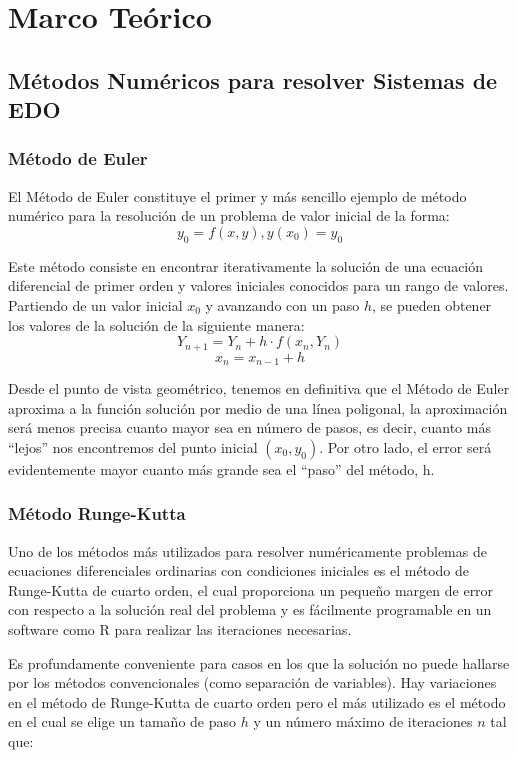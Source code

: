 \documentclass[a4paper,12pt]{article}
\begin{document}
\section{Marco Teórico}

\subsection{Métodos Numéricos para resolver Sistemas de EDO}

\subsubsection{Método de Euler}

El Método de Euler constituye el primer y más sencillo ejemplo de método numérico para la resolución de un problema de valor inicial de la forma:
 \[ y_0 = f(x, y) ,  y(x_0) = y_0 \]

Este método consiste en encontrar iterativamente la solución de una ecuación diferencial de primer orden y valores iniciales conocidos para un rango de valores. Partiendo de un valor inicial $x_0$ y avanzando con un paso $h$, se pueden obtener los valores de la solución de la siguiente manera:
\[ Y_{n+1} = Y_n + h · f(x_n, Y_n) \]
\[ x_n = x_{n-1} + h \]

Desde el punto de vista geométrico, tenemos en definitiva que el Método de Euler
aproxima a la función solución por medio de una línea poligonal, la aproximación será menos precisa cuanto mayor sea en número de pasos, es decir, cuanto más “lejos” nos encontremos del punto inicial $(x_0, y_0)$. Por otro lado, el error será evidentemente mayor cuanto más grande sea el “paso” del método, h.

\subsubsection{Método Runge-Kutta}

Uno de los métodos más utilizados para resolver numéricamente problemas de ecuaciones diferenciales ordinarias con condiciones iniciales es el método de Runge-Kutta de cuarto orden, el cual proporciona un pequeño margen de error con respecto a la solución real del problema y es fácilmente programable en un software como R para realizar las iteraciones necesarias. \par

Es profundamente conveniente para casos en los que la solución no puede hallarse por los métodos convencionales (como separación de variables). Hay variaciones en el
método de Runge-Kutta de cuarto orden pero el más utilizado es el método en el
cual se elige un tamaño de paso $h$ y un número máximo de iteraciones $n$ tal que: \par
\end{document}
